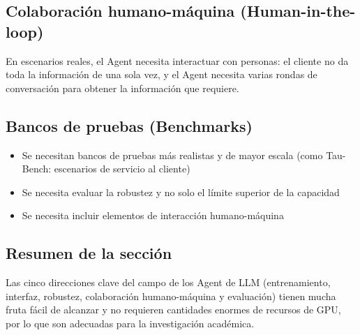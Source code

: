 \subsection{Colaboración humano-máquina (Human-in-the-loop)}

En escenarios reales, el Agent necesita interactuar con personas: el cliente no da toda la información de una sola vez, y el Agent necesita varias rondas de conversación para obtener la información que requiere.

\subsection{Bancos de pruebas (Benchmarks)}

\begin{itemize}
    \item Se necesitan bancos de pruebas más realistas y de mayor escala (como Tau-Bench: escenarios de servicio al cliente)
    \item Se necesita evaluar la robustez y no solo el límite superior de la capacidad
    \item Se necesita incluir elementos de interacción humano-máquina
\end{itemize}

\subsection{Resumen de la sección}

Las cinco direcciones clave del campo de los Agent de LLM (entrenamiento, interfaz, robustez, colaboración humano-máquina y evaluación) tienen mucha fruta fácil de alcanzar y no requieren cantidades enormes de recursos de GPU, por lo que son adecuadas para la investigación académica.


